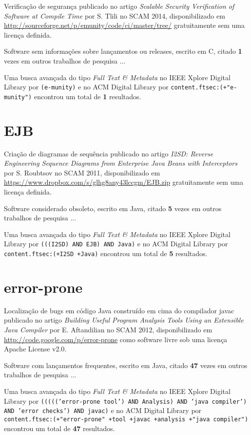 Verificação de segurança
publicado no artigo {\it Scalable Security Verification of Software at Compile Time}
por S. Tlili
no SCAM 2014,
disponibilizado em \url{http://sourceforge.net/p/emunity/code/ci/master/tree/}
gratuitamente
sem uma licença definida.

Software sem informações sobre lançamentos ou releases,
escrito em C,
citado {\bf 1} vezes em outros trabalhos de pesquisa ...

Uma busca avançada do tipo {\it Full Text \& Metadata} no IEEE Xplore Digital Library por
\texttt{(e-munity)}
e no ACM Digital Library por
\texttt{content.ftsec:(+"e-munity")}
encontrou um total de
{\bf 1}
resultados.

\section{EJB}

Criação de diagramas de sequência
publicado no artigo {\it I2SD: Reverse Engineering Sequence Diagrams from Enterprise Java Beans with Interceptors}
por S. Roubtsov
no SCAM 2011,
disponibilizado em \url{https://www.dropbox.com/s/glhg8any43lccgm/EJB.zip}
gratuitamente
sem uma licença definida.

Software considerado obsoleto,
escrito em Java,
citado {\bf 5} vezes em outros trabalhos de pesquisa ...

Uma busca avançada do tipo {\it Full Text \& Metadata} no IEEE Xplore Digital Library por
\texttt{(((I2SD) AND EJB) AND Java)}
e no ACM Digital Library por
\texttt{content.ftsec:(+I2SD +Java)}
encontrou um total de
{\bf 5}
resultados.

\section{error-prone}

Localização de bugs em código Java construído em cima do compilador javac
publicado no artigo {\it Building Useful Program Analysis Tools Using an Extensible Java Compiler}
por E. Aftandilian
no SCAM 2012,
disponibilizado em \url{http://code.google.com/p/error-prone}
como software livre
sob uma licença Apache License v2.0.

Software com lançamentos frequentes,
escrito em Java,
citado {\bf 47} vezes em outros trabalhos de pesquisa ...

Uma busca avançada do tipo {\it Full Text \& Metadata} no IEEE Xplore Digital Library por
\texttt{((((('error-prone tool') AND Analysis) AND 'java compiler') AND 'error checks') AND javac)}
e no ACM Digital Library por
\texttt{content.ftsec:(+"error-prone" +tool +javac +analysis +"java compiler")}
encontrou um total de
{\bf 47}
resultados.

